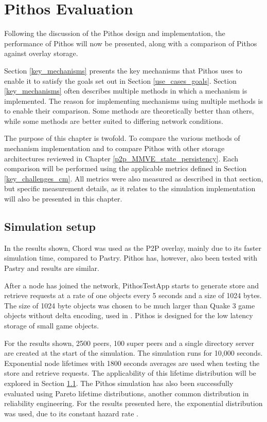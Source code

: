 \chapter{Pithos Evaluation}
    \label{chp:EVALUATION}

Following the discussion of the Pithos design and implementation, the performance of Pithos will now be presented, along with a comparison of Pithos against overlay storage.

Section \ref{key_mechanisms} presents the key mechanisms that Pithos uses to enable it to satisfy the goals set out in Section \ref{use_cases_goals}. Section \ref{key_mechanisms} often describes multiple methods in which a mechanism is implemented. The reason for implementing mechanisms using multiple methods is to enable their comparison. Some methods are theoretically better than others, while some methods are better suited to differing network conditions.

The purpose of this chapter is twofold. To compare the various methods of mechanism implementation and to compare Pithos with other storage architectures reviewed in Chapter \ref{p2p_MMVE_state_persistency}. Each comparison will be performed using the applicable metrics defined in Section \ref{key_challenges_cm}. All metrics were also measured as described in that section, but specific measurement details, as it relates to the simulation implementation will also be presented in this chapter.

\section{Simulation setup}

In the results shown, Chord was used as the P2P overlay, mainly due to its faster simulation time, compared to Pastry. Pithos has, however, also been tested with Pastry and results are similar.

After a node has joined the network, PithosTestApp starts to generate store and retrieve requests at a rate of one objects every 5 seconds and a size of 1024 bytes. The size of 1024 byte objects was chosen to be much larger than Quake 3 game objects without delta encoding, used in \cite{Bharambe_Donnybrook}. Pithos is designed for the low latency storage of small game objects.

For the results shown, 2500 peers, 100 super peers and a single directory server are created at the start of the simulation. The simulation runs for 10,000 seconds. Exponential node lifetimes with 1800 seconds averages are used when testing the store and retrieve requests. The applicability of this lifetime distribution will be explored in Section \ref{}. The Pithos simulation has also been successfully evaluated using Pareto lifetime distributions, another common distribution in reliability engineering. For the results presented here, the exponential distribution was used, due to its constant hazard rate \cite{}.

